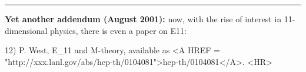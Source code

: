 \par\noindent\rule{\textwidth}{0.4pt}
\textbf{Yet another addendum (August 2001):} now, with the rise of interest
in 11-dimensional physics, there is even a paper on E11:

12) P. West, E_{11} and M-theory, available as <A HREF = "http://xxx.lanl.gov/abs/hep-th/0104081">hep-th/0104081</A>.
<HR>



